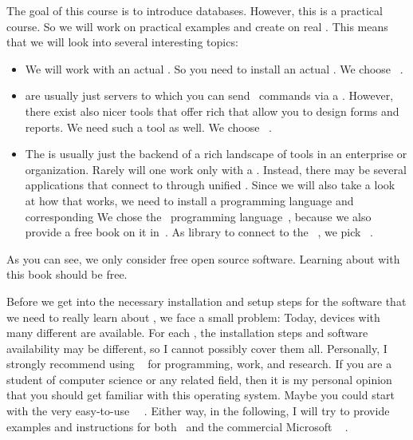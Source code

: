 %
%
%
The goal of this course is to introduce databases.
However, this is a practical course.
So we will work on practical examples and create   on real .
This means that we will look into several interesting topics:%
%
\begin{itemize}%
%
\item We will work with an actual . %
So you need to install an actual . %
We choose \postgresql~\cite{TA2024DDAMWPAM,FP2023LP,OH2017PUAR,B2024PELUYDW}.%
%
\item {} are usually just servers to which you can send \sql\ commands via a  . %
However, there exist also nicer tools that offer rich  that allow you to design forms and reports. %
We need such a tool as well. %
We choose \libreofficeBase~\cite{FNFHWSKLSSGLFRSRPLJG2022BG7R1BOL7C,S2022L7PFEUU}.%
%
\item The  is usually just the backend of a rich landscape of tools in an enterprise or organization. %
Rarely will one work only with a . %
Instead, there may be several applications that connect to  through unified . %
Since we will also take a look at how that works, we need to install a programming language and corresponding  %
We chose the \python\ programming language~\cite{K2018EIPFEUU,A2002PC,H2023ABGTP3P,LH2015DSAAWP}, because we also provide a free book on it in~\cite{programmingWithPython}. %
As library to connect to the \postgresql\ , we pick \psycopg~\cite{VDGE2010P}.%
%
\end{itemize}%
%
As you can see, we only consider free open source software.
Learning about  with this book should be free.

Before we get into the necessary installation and setup steps for the software that we need to really learn about , we face a small problem:
Today, devices with many different  are available.
For each , the installation steps and software availability may be different, so I cannot possibly cover them all.
Personally, I strongly recommend using \linux~\cite{T1999TLE,B2022ELATCL,H2022LML} for programming, work, and research.
If you are a student of computer science or any related field, then it is my personal opinion that you should get familiar with this operating system.
Maybe you could start with the very easy-to-use \ubuntu\ \linux~\cite{CN2020ULB,H2020ULU2E}.
Either way, in the following, I will try to provide examples and instructions for both \ubuntu\ and the commercial Microsoft \windows~\cite{B2023W1IO} .%
%
%
%
%
%
\endhsection%
%
